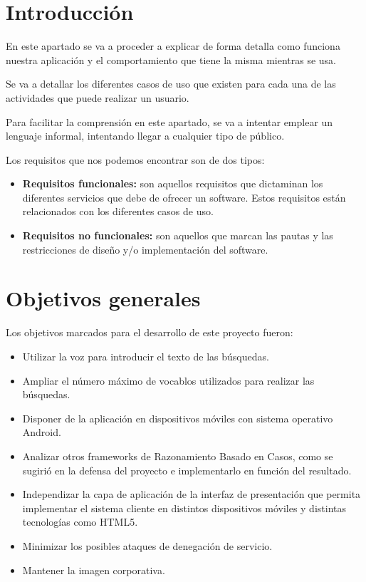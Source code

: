 
\section{Introducción}
En este apartado se va a proceder a explicar de forma detalla como funciona nuestra aplicación y el comportamiento que tiene la misma mientras se usa.

Se va a detallar los diferentes casos de uso que existen para cada una de las actividades que puede realizar un usuario.

Para facilitar la comprensión en este apartado, se va a intentar emplear un lenguaje informal, intentando llegar a cualquier tipo de público.

Los requisitos que nos podemos encontrar son de dos tipos:

\begin{itemize}
	\tightlist
	\item
	\textbf{Requisitos funcionales: } son aquellos requisitos que dictaminan los diferentes servicios que debe de ofrecer un software. Estos requisitos están relacionados con los diferentes casos de uso.
	
	\item
	\textbf{Requisitos no funcionales: } son aquellos que marcan las pautas y las restricciones de diseño y/o implementación del software. 
\end{itemize}


\section{Objetivos generales}

Los objetivos marcados para el desarrollo de este proyecto fueron:

\begin{itemize}
	\tightlist
	\item
	Utilizar la voz para introducir el texto de las búsquedas.
	\item 
	Ampliar el número máximo de vocablos utilizados para realizar las búsquedas.
	\item 
	Disponer de la aplicación en dispositivos móviles con sistema operativo Android.
	\item 
	Analizar otros frameworks de Razonamiento Basado en Casos, como se sugirió en la defensa del proyecto e implementarlo en función del resultado.
	\item 
	Independizar la capa de aplicación de la interfaz de presentación que permita implementar el sistema cliente en distintos dispositivos móviles y distintas tecnologías como HTML5.
	\item 
	Minimizar los posibles ataques de denegación de servicio.
	\item 
	Mantener la imagen corporativa.
\end{itemize}

